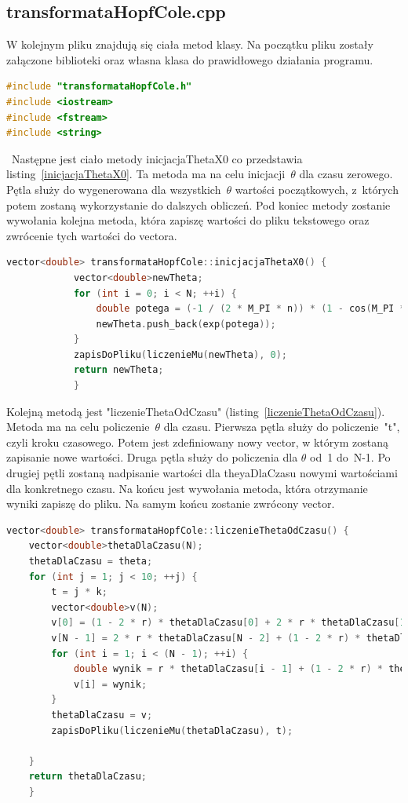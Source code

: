 \documentclass[10pt, a4paper]{article}
\begin{document}
		\subsection{transformataHopfCole.cpp}
		W kolejnym pliku znajdują się ciała metod klasy. Na początku pliku zostały załączone biblioteki oraz własna klasa do prawidłowego działania programu. 
					\begin{lstlisting}[caption={poczadek pliku transformataHopfCole.cpp},label={poczadek.cpp}, language=C++]
#include "transformataHopfCole.h"
#include <iostream>
#include <fstream>
#include <string>\end{lstlisting}
	\	Następne jest ciało metody inicjacjaThetaX0 co przedstawia listing~\ref{inicjacjaThetaX0}. Ta metoda ma na celu inicjacji~$\theta$ dla czasu zerowego. Pętla służy do wygenerowana dla wszystkich~$\theta$ wartości początkowych, z~których potem zostaną wykorzystanie do dalszych obliczeń. Pod koniec metody zostanie wywołania kolejna metoda, która zapiszę wartości do pliku tekstowego oraz zwrócenie tych wartości do vectora.
						\begin{lstlisting}[caption={ciało metody inicjacjaThetaX0},label={inicjacjaThetaX0}, language=C++]
		vector<double> transformataHopfCole::inicjacjaThetaX0() {
			vector<double>newTheta;
			for (int i = 0; i < N; ++i) {
				double potega = (-1 / (2 * M_PI * n)) * (1 - cos(M_PI * (i * h)));
				newTheta.push_back(exp(potega));
			}
			zapisDoPliku(liczenieMu(newTheta), 0);
			return newTheta;
			}\end{lstlisting}
		Kolejną metodą jest "liczenieThetaOdCzasu" (listing~\ref{liczenieThetaOdCzasu}). Metoda ma na celu policzenie~$\theta$ dla czasu. Pierwsza pętla służy do policzenie~"t", czyli kroku czasowego. Potem jest zdefiniowany nowy vector, w którym zostaną zapisanie nowe wartości. Druga pętla służy do policzenia dla $\theta$ od~1 do~N-1. Po drugiej pętli zostaną nadpisanie wartości dla theyaDlaCzasu nowymi wartościami dla konkretnego czasu. Na końcu jest wywołania metoda, która otrzymanie wyniki zapiszę do pliku. Na samym końcu zostanie zwrócony vector.   
								\begin{lstlisting}[caption={ciało metody liczenieThetaOdCzasu},label={liczenieThetaOdCzasu}, language=C++]
vector<double> transformataHopfCole::liczenieThetaOdCzasu() {
	vector<double>thetaDlaCzasu(N);
	thetaDlaCzasu = theta;
	for (int j = 1; j < 10; ++j) {
		t = j * k;
		vector<double>v(N);
		v[0] = (1 - 2 * r) * thetaDlaCzasu[0] + 2 * r * thetaDlaCzasu[1]; //warunki brzegowe  
		v[N - 1] = 2 * r * thetaDlaCzasu[N - 2] + (1 - 2 * r) * thetaDlaCzasu[N - 1];
		for (int i = 1; i < (N - 1); ++i) {
			double wynik = r * thetaDlaCzasu[i - 1] + (1 - 2 * r) * thetaDlaCzasu[i] + r * thetaDlaCzasu[i + 1];
			v[i] = wynik;
		}
		thetaDlaCzasu = v;
		zapisDoPliku(liczenieMu(thetaDlaCzasu), t);
		
	}
	return thetaDlaCzasu;
	}\end{lstlisting}
\end{document}
